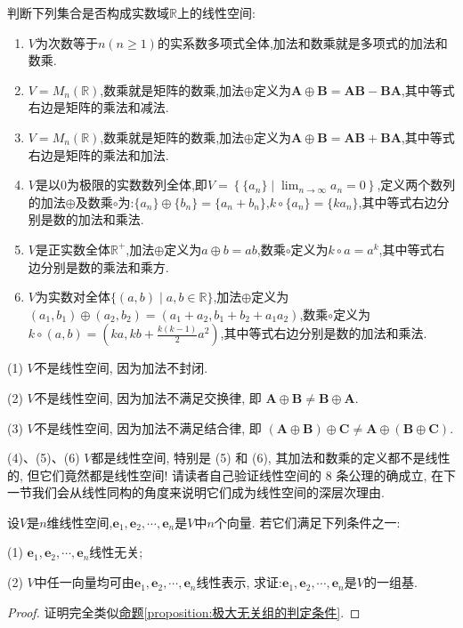 \documentclass[lang=cn,newtx,10pt,scheme=chinese]{elegantbook}
\begin{document}
\begin{example}\label{example:3.3}
判断下列集合是否构成实数域\(\mathbb{R}\)上的线性空间:
\begin{enumerate}[(1)]
\item \(V\)为次数等于\(n(n\geq1)\)的实系数多项式全体,加法和数乘就是多项式的加法和数乘.
\item \(V = M_n(\mathbb{R})\),数乘就是矩阵的数乘,加法\(\oplus\)定义为\(\boldsymbol{A}\oplus\boldsymbol{B}=\boldsymbol{A}\boldsymbol{B}-\boldsymbol{B}\boldsymbol{A}\),其中等式右边是矩阵的乘法和减法.
\item \(V = M_n(\mathbb{R})\),数乘就是矩阵的数乘,加法\(\oplus\)定义为\(\boldsymbol{A}\oplus\boldsymbol{B}=\boldsymbol{A}\boldsymbol{B}+\boldsymbol{B}\boldsymbol{A}\),其中等式右边是矩阵的乘法和加法.
\item \label{example:3.3(4)}\(V\)是以\(0\)为极限的实数数列全体,即\(V = \left\{\{a_n\}\mid\lim_{n\rightarrow\infty}a_n = 0\right\}\),定义两个数列的加法\(\oplus\)及数乘\(\circ\)为:\(\{a_n\}\oplus\{b_n\}=\{a_n + b_n\}\),\(k\circ\{a_n\}=\{ka_n\}\),其中等式右边分别是数的加法和乘法.
\item \label{example:3.3(5)}\(V\)是正实数全体\(\mathbb{R}^+\),加法\(\oplus\)定义为\(a\oplus b = ab\),数乘\(\circ\)定义为\(k\circ a = a^k\),其中等式右边分别是数的乘法和乘方.
\item \label{example:3.3(6)}\(V\)为实数对全体\(\{(a,b)\mid a,b\in\mathbb{R}\}\),加法\(\oplus\)定义为\((a_1,b_1)\oplus(a_2,b_2)=(a_1 + a_2,b_1 + b_2 + a_1a_2)\),数乘\(\circ\)定义为\(k\circ(a,b)=(ka,kb+\frac{k(k - 1)}{2}a^2)\),其中等式右边分别是数的加法和乘法.
\end{enumerate}
\end{example}
\begin{solution}
(1) \(V\)不是线性空间, 因为加法不封闭.

(2) \(V\)不是线性空间, 因为加法不满足交换律, 即 \(\boldsymbol{A}\oplus\boldsymbol{B}\neq\boldsymbol{B}\oplus\boldsymbol{A}\).

(3) \(V\)不是线性空间, 因为加法不满足结合律, 即 \((\boldsymbol{A}\oplus\boldsymbol{B})\oplus\boldsymbol{C}\neq\boldsymbol{A}\oplus(\boldsymbol{B}\oplus\boldsymbol{C})\).

(4)、(5)、(6) \(V\)都是线性空间, 特别是 (5) 和 (6), 其加法和数乘的定义都不是线性的, 但它们竟然都是线性空间! 请读者自己验证线性空间的 8 条公理的确成立, 在下一节我们会从线性同构的角度来说明它们成为线性空间的深层次理由.
\end{solution}

\begin{proposition}
设\(V\)是\(n\)维线性空间,\(\boldsymbol{e}_1,\boldsymbol{e}_2,\cdots,\boldsymbol{e}_n\)是\(V\)中\(n\)个向量. 若它们满足下列条件之一:

(1) \(\boldsymbol{e}_1,\boldsymbol{e}_2,\cdots,\boldsymbol{e}_n\)线性无关;

(2) \(V\)中任一向量均可由\(\boldsymbol{e}_1,\boldsymbol{e}_2,\cdots,\boldsymbol{e}_n\)线性表示,
求证:\(\boldsymbol{e}_1,\boldsymbol{e}_2,\cdots,\boldsymbol{e}_n\)是\(V\)的一组基.
\end{proposition}
\begin{proof}
证明完全类似\hyperref[proposition:极大无关组的判定条件]{命题\ref{proposition:极大无关组的判定条件}}.
\end{proof}
\end{document}
